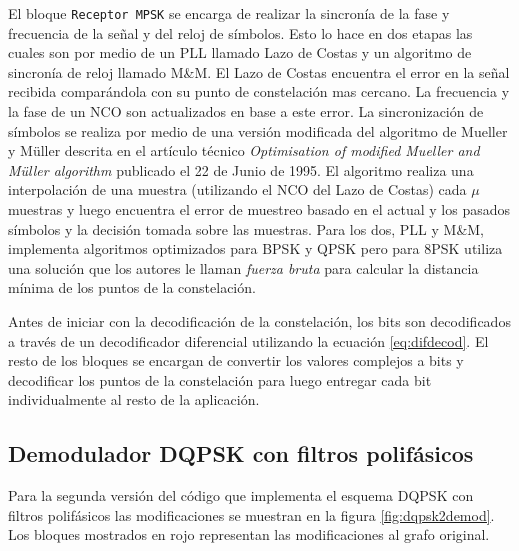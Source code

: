El bloque \verb|Receptor MPSK| se encarga de realizar la sincron\'ia de la fase y frecuencia de la se\~nal y del reloj de
s\'imbolos. Esto lo hace en dos etapas las cuales son por medio de un PLL llamado Lazo de Costas y un algoritmo de sincron\'ia de
reloj llamado M\&M. El Lazo de Costas encuentra el error en la se\~nal recibida compar\'andola con su punto de constelaci\'on mas
cercano. La frecuencia y la fase de un NCO son actualizados en base a este error. La sincronizaci\'on de s\'imbolos se realiza por
medio de una versi\'on modificada del algoritmo de Mueller y M\"uller descrita en el art\'iculo t\'ecnico \emph{Optimisation of
modified Mueller and M\"uller algorithm} publicado el 22 de Junio de 1995. El algoritmo realiza una interpolaci\'on de una muestra
(utilizando el NCO del Lazo de Costas) cada $\mu$ muestras y luego encuentra el error de muestreo basado en el actual y los
pasados s\'imbolos y la decisi\'on tomada sobre las muestras. Para los dos, PLL y M\&M, \gnuradio implementa algoritmos
optimizados para BPSK y QPSK pero para 8PSK utiliza una soluci\'on que los autores le llaman \emph{fuerza bruta} para calcular la
distancia m\'inima de los puntos de la constelaci\'on.

Antes de iniciar con la decodificaci\'on de la constelaci\'on, los bits son decodificados a trav\'es de un decodificador
diferencial utilizando la ecuaci\'on \eqref{eq:difdecod}. El resto de los bloques se encargan de convertir los valores
complejos a bits y decodificar los puntos de la constelaci\'on para luego entregar cada bit individualmente al resto de la aplicaci\'on. 

\subsection{Demodulador DQPSK con filtros polif\'asicos}

Para la segunda versi\'on del c\'odigo que implementa el esquema DQPSK con filtros polif\'asicos las modificaciones se
muestran en la figura \ref{fig:dqpsk2demod}. Los bloques mostrados en rojo representan las modificaciones al grafo original.

